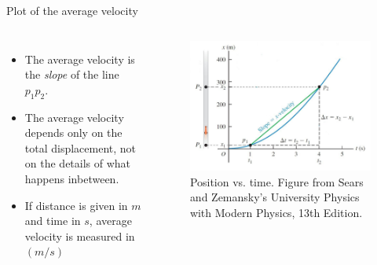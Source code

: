 \documentclass[]{beamer}
\begin{document}
\begin{frame}
Plot of the average velocity

   \begin{columns}[c]
   \column{2in}  %
  
\begin{itemize}
\item  The average velocity is the \textit{slope} of the line $p_1p_2$.
\item The average velocity depends only on the total displacement,
not on the details of what happens inbetween. 
\item If distance is given in $m$ and time in $s$, average velocity is measured
in $(m/s)$
\end{itemize}



   \column{2.5in}
   
   \begin{figure}[h!]
 
  \includegraphics[width=1.\textwidth]{images/4.jpg}
   \caption{Position vs. time. {\tiny Figure from Sears and Zemansky's University Physics 
   with Modern Physics, 13th Edition.} }
\end{figure}



   \end{columns}




 \end{frame}
\end{document}
